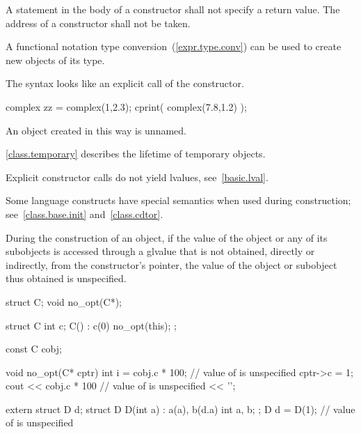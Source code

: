 \pnum
{}%
A
statement in the body of a constructor shall not specify a return value.
%
The address of a constructor shall not be taken.

\pnum
{}%
%
A functional notation type conversion~(\ref{expr.type.conv}) can be used
to create new objects of its type.
\begin{note}
The syntax looks like an explicit call of the constructor.
\end{note}
\begin{example}
%

\begin{codeblock}
complex zz = complex(1,2.3);
cprint( complex(7.8,1.2) );
\end{codeblock}
\end{example}

\pnum
An object created in this way is unnamed.
\begin{note}
\ref{class.temporary} describes the lifetime of temporary objects.
\end{note}
\begin{note}
Explicit constructor calls do not yield lvalues, see~\ref{basic.lval}.
\end{note}

\pnum
\begin{note}
%
Some language constructs have special semantics when used during construction;
see~\ref{class.base.init} and~\ref{class.cdtor}.
\end{note}

\pnum
During the construction of an object,
if the value of the object or any of its subobjects is
accessed through a glvalue that is not obtained, directly or indirectly, from
the constructor's
pointer, the value of the object or subobject thus obtained is unspecified.
\begin{example}

\begin{codeblock}
struct C;
void no_opt(C*);

struct C {
  int c;
  C() : c(0) { no_opt(this); }
};

const C cobj;

void no_opt(C* cptr) {
  int i = cobj.c * 100;         // value of  is unspecified
  cptr->c = 1;
  cout << cobj.c * 100          // value of  is unspecified
       << '\n';
}

extern struct D d;
struct D {
  D(int a) : a(a), b(d.a) {}
  int a, b;
};
D d = D(1);                     // value of  is unspecified
\end{codeblock}
\end{example}

